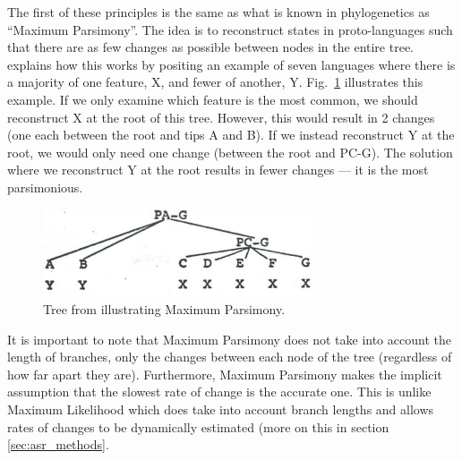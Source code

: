 \documentclass[a4paper,10pt]{article} %
\begin{document}
The first of these principles is the same as what is known in phylogenetics as ``Maximum Parsimony''. The idea is to reconstruct states in proto-languages such that there are as few changes as possible between nodes in the entire tree. \citet[17-22]{clark1976aspects} explains how this works by positing an example of seven languages where there is a majority of one feature, X, and fewer of another, Y. Fig.~\ref{fig:clark_tree} illustrates this example. If we only examine which feature is the most common, we should reconstruct X at the root of this tree. However, this would result in 2 changes (one each between the root and tips A and B). If we instead reconstruct Y at the root, we would only need one change (between the root and PC-G). The solution where we reconstruct Y at the root results in fewer changes --- it is the most parsimonious.
 
\begin{figure}[h]
\centering
\includegraphics[width=8cm]{illustrations/Clark_1977_tree.png}
\caption{{Tree from \citet[19]{clark1976aspects} illustrating Maximum Parsimony.}}
\label{fig:clark_tree}
\end{figure}

It is important to note that Maximum Parsimony does not take into account the length of branches, only the changes between each node of the tree (regardless of how far apart they are). Furthermore, Maximum Parsimony makes the implicit assumption that the slowest rate of change is the accurate one. This is unlike Maximum Likelihood which does take into account branch lengths and allows rates of changes to be dynamically estimated (more on this in section \ref{sec:asr_methods}.

\end{document}
